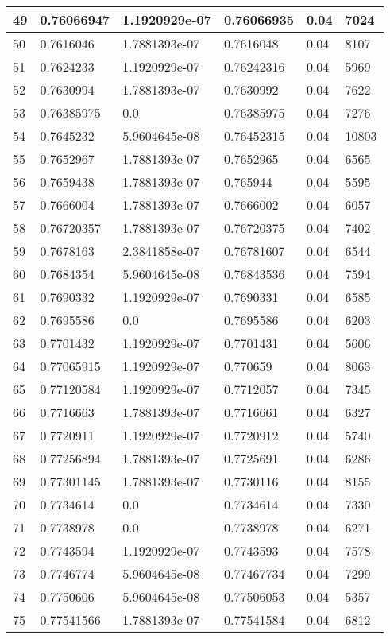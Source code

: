 \begin{longtable}{|l|l|l|l|l|l|}
49 & 0.76066947 & 1.1920929e-07 & 0.76066935 & 0.04 & 7024 \\ \hline 
50 & 0.7616046 & 1.7881393e-07 & 0.7616048 & 0.04 & 8107 \\ \hline 
51 & 0.7624233 & 1.1920929e-07 & 0.76242316 & 0.04 & 5969 \\ \hline 
52 & 0.7630994 & 1.7881393e-07 & 0.7630992 & 0.04 & 7622 \\ \hline 
53 & 0.76385975 & 0.0 & 0.76385975 & 0.04 & 7276 \\ \hline 
54 & 0.7645232 & 5.9604645e-08 & 0.76452315 & 0.04 & 10803 \\ \hline 
55 & 0.7652967 & 1.7881393e-07 & 0.7652965 & 0.04 & 6565 \\ \hline 
56 & 0.7659438 & 1.7881393e-07 & 0.765944 & 0.04 & 5595 \\ \hline 
57 & 0.7666004 & 1.7881393e-07 & 0.7666002 & 0.04 & 6057 \\ \hline 
58 & 0.76720357 & 1.7881393e-07 & 0.76720375 & 0.04 & 7402 \\ \hline 
59 & 0.7678163 & 2.3841858e-07 & 0.76781607 & 0.04 & 6544 \\ \hline 
60 & 0.7684354 & 5.9604645e-08 & 0.76843536 & 0.04 & 7594 \\ \hline 
61 & 0.7690332 & 1.1920929e-07 & 0.7690331 & 0.04 & 6585 \\ \hline 
62 & 0.7695586 & 0.0 & 0.7695586 & 0.04 & 6203 \\ \hline 
63 & 0.7701432 & 1.1920929e-07 & 0.7701431 & 0.04 & 5606 \\ \hline 
64 & 0.77065915 & 1.1920929e-07 & 0.770659 & 0.04 & 8063 \\ \hline 
65 & 0.77120584 & 1.1920929e-07 & 0.7712057 & 0.04 & 7345 \\ \hline 
66 & 0.7716663 & 1.7881393e-07 & 0.7716661 & 0.04 & 6327 \\ \hline 
67 & 0.7720911 & 1.1920929e-07 & 0.7720912 & 0.04 & 5740 \\ \hline 
68 & 0.77256894 & 1.7881393e-07 & 0.7725691 & 0.04 & 6286 \\ \hline 
69 & 0.77301145 & 1.7881393e-07 & 0.7730116 & 0.04 & 8155 \\ \hline 
70 & 0.7734614 & 0.0 & 0.7734614 & 0.04 & 7330 \\ \hline 
71 & 0.7738978 & 0.0 & 0.7738978 & 0.04 & 6271 \\ \hline 
72 & 0.7743594 & 1.1920929e-07 & 0.7743593 & 0.04 & 7578 \\ \hline 
73 & 0.7746774 & 5.9604645e-08 & 0.77467734 & 0.04 & 7299 \\ \hline 
74 & 0.7750606 & 5.9604645e-08 & 0.77506053 & 0.04 & 5357 \\ \hline 
75 & 0.77541566 & 1.7881393e-07 & 0.77541584 & 0.04 & 6812 \\ \hline 
\end{longtable}